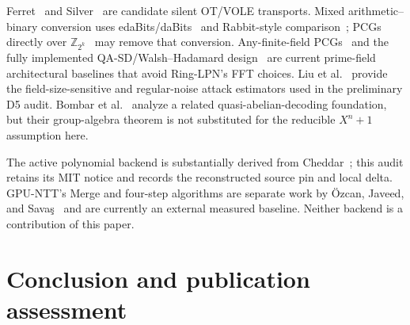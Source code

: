 \documentclass[11pt]{article}
\begin{document}
Ferret~\cite{yang2020ferret} and Silver~\cite{couteau2021silver} are candidate
silent OT/VOLE transports. Mixed arithmetic--binary conversion uses
edaBits/daBits~\cite{escudero2020edabits} and Rabbit-style
comparison~\cite{makri2021rabbit}; PCGs directly over
$\mathbb Z_{2^k}$~\cite{li2025galoisring} may remove that conversion.
Any-finite-field PCGs~\cite{li2025finitefield} and the fully implemented
QA-SD/Walsh--Hadamard design~\cite{li2026wht} are current prime-field
architectural baselines that avoid Ring-LPN's FFT choices. Liu et
al.~\cite{liu2024hardness} provide the field-size-sensitive and regular-noise
attack estimators used in the preliminary D5 audit.
Bombar et al.~\cite{bombar2023quasiabelian} analyze a related
quasi-abelian-decoding foundation, but their group-algebra theorem is not
substituted for the reducible $X^n+1$ assumption here.

The active polynomial backend is substantially derived from
Cheddar~\cite{choi2026cheddar}; this audit retains its MIT notice and records
the reconstructed source pin and local delta. GPU-NTT's Merge and four-step
algorithms are separate work by \"Ozcan, Javeed, and
Sava\c{s}~\cite{ozcan2023gpuntt,ozcan2025gpuntt} and are currently an external
measured baseline. Neither backend is a contribution of this paper.

\section{Conclusion and publication assessment}
\label{sec:summary}
\end{document}
